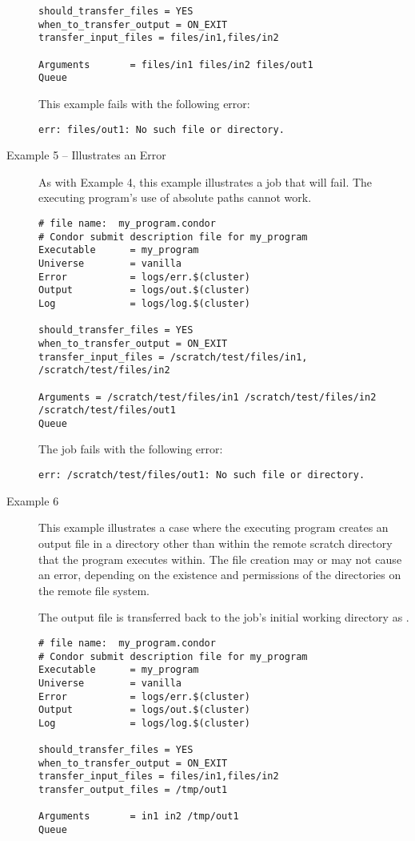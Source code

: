 \begin{description}
\begin{verbatim}
should_transfer_files = YES
when_to_transfer_output = ON_EXIT
transfer_input_files = files/in1,files/in2

Arguments       = files/in1 files/in2 files/out1
Queue
\end{verbatim}
\normalsize

This example fails with the following error:
\footnotesize
\begin{verbatim}
err: files/out1: No such file or directory.
\end{verbatim}
\normalsize

\item[Example 5 -- Illustrates an Error]

As with Example 4,
this example illustrates a job that will fail.
The executing program's use of 
absolute paths cannot work.

\footnotesize
\begin{verbatim}
# file name:  my_program.condor
# Condor submit description file for my_program
Executable      = my_program
Universe        = vanilla
Error           = logs/err.$(cluster)
Output          = logs/out.$(cluster)
Log             = logs/log.$(cluster)

should_transfer_files = YES
when_to_transfer_output = ON_EXIT
transfer_input_files = /scratch/test/files/in1, /scratch/test/files/in2

Arguments = /scratch/test/files/in1 /scratch/test/files/in2 /scratch/test/files/out1
Queue
\end{verbatim}
\normalsize

The job fails with the following error:
\footnotesize
\begin{verbatim}
err: /scratch/test/files/out1: No such file or directory.
\end{verbatim}
\normalsize

\item[Example 6]

This example illustrates a case
where the executing program creates an output file in a directory
other than within the remote scratch directory that the 
program executes within.
The file creation may or may not cause an error,
depending on the existence and permissions
of the directories on the remote file system.

The output file  is transferred back to the job's
initial working directory as .

\footnotesize
\begin{verbatim}
# file name:  my_program.condor
# Condor submit description file for my_program
Executable      = my_program
Universe        = vanilla
Error           = logs/err.$(cluster)
Output          = logs/out.$(cluster)
Log             = logs/log.$(cluster)

should_transfer_files = YES
when_to_transfer_output = ON_EXIT
transfer_input_files = files/in1,files/in2
transfer_output_files = /tmp/out1

Arguments       = in1 in2 /tmp/out1
Queue
\end{verbatim}
\normalsize

\end{description}


